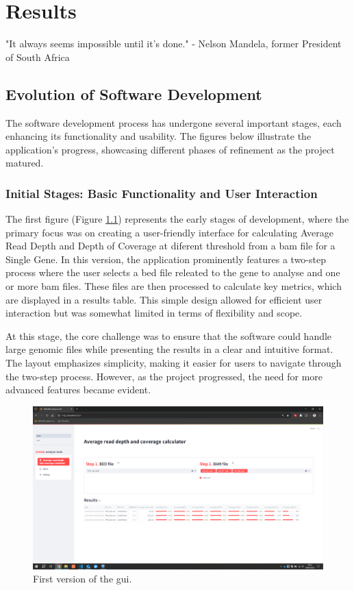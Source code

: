 \chapter{Results}
\label{chapter:Results}

\begin{introduction}
    "It always seems impossible until it's done." - Nelson Mandela, former President of South Africa
\end{introduction}

\section{Evolution of Software Development}

The software development process has undergone several important stages, each enhancing its functionality and usability. The figures below illustrate the application's progress, showcasing different phases of refinement as the project matured.

\subsection{Initial Stages: Basic Functionality and User Interaction}

The first figure (Figure \ref{fig:v1}) represents the early stages of development, where the primary focus was on creating a user-friendly interface for calculating Average Read Depth and Depth of Coverage at diferent threshold from a \ac{bam} file for a Single Gene. In this version, the application prominently features a two-step process where the user selects a \ac{bed} file releated to the gene to analyse and one or more \ac{bam} files. These files are then processed to calculate key metrics, which are displayed in a results table. This simple design allowed for efficient user interaction but was somewhat limited in terms of flexibility and scope.

At this stage, the core challenge was to ensure that the software could handle large genomic files while presenting the results in a clear and intuitive format. The layout emphasizes simplicity, making it easier for users to navigate through the two-step process. However, as the project progressed, the need for more advanced features became evident.

\begin{figure}[H]
    \centering
    \includegraphics[width=1\textwidth]{figs/v1.png}
    \caption{First version of the \ac{gui}.} 
    \label{fig:v1}
\end{figure}

